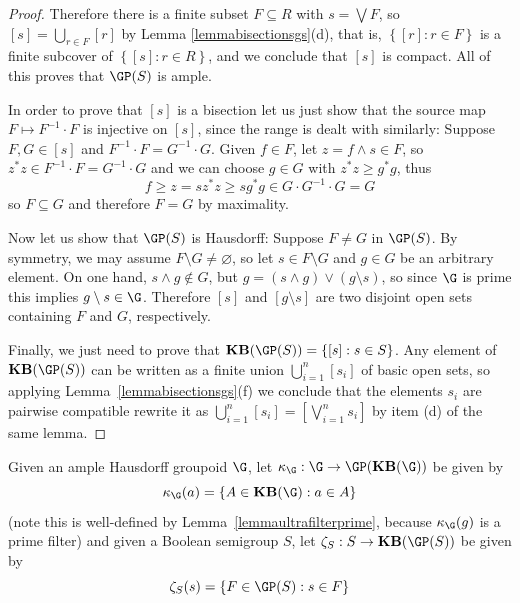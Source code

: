 \begin{proof}
Therefore there is a finite subset $F\subseteq R$ with $s=\bigvee F$, so $[s]=\bigcup_{r\in F}[r]$ by Lemma \ref{lemmabisectionsgs}(d), that is, $\left\{[r]:r\in F\right\}$ is a finite subcover of $\left\{[s]:r\in R\right\}$, and we conclude that $[s]$ is compact. All of this proves that $\GP(S)$ is ample.

In order to prove that $[s]$ is a bisection let us just show that the source map $F\mapsto F^{-1}\cdot F$ is injective on $[s]$, since the range is dealt with similarly: Suppose $F,G\in [s]$ and $F^{-1}\cdot F=G^{-1}\cdot G$. Given $f\in F$, let $z=f\land s\in F$, so $z^*z\in F^{-1}\cdot F=G^{-1}\cdot G$ and we can choose $g\in G$ with $z^*z\geq g^*g$, thus
\[f\geq z=sz^*z\geq sg^*g\in G\cdot G^{-1}\cdot G=G\]
so $F\subseteq G$ and therefore $F=G$ by maximality. 

Now let us show that $\GP(S)$ is Hausdorff: Suppose $F\neq G$ in $\GP(S)$. By symmetry, we may assume $ F\setminus G\neq\varnothing$, so let $s\in F\setminus G$ and $g\in G$ be an arbitrary element. On one hand, $s\land g\not\in G$, but $g=(s\land g)\lor(g\setminus s)$, so since $\G$ is prime this implies $g\setminus s\in\G$. Therefore $[s]$ and $[g\setminus s]$ are two disjoint open sets containing $F$ and $G$, respectively.

Finally, we just need to prove that $\mathbf{KB}(\GP(S))=\left\{[s]:s\in S\right\}$. Any element of $\mathbf{KB}(\GP(S))$ can be written as a finite union $\bigcup_{i=1}^n[s_i]$ of basic open sets, so applying Lemma~\ref{lemmabisectionsgs}(f) we conclude that the elements $s_i$ are pairwise compatible rewrite it as $\bigcup_{i=1}^n[s_i]=[\bigvee_{i=1}^n s_i]$ by item (d) of the same lemma.\qedhere
\end{proof}

Given an ample Hausdorff groupoid $\G$, let $\kappa_{\G}:\G\to\GP(\mathbf{KB}(\G))$ be given by
\[\kappa_{\G}(a)=\left\{A\in\mathbf{KB}(\G):a\in A\right\}\]
(note this is well-defined by Lemma~\ref{lemmaultrafilterprime}, because $\kappa_{\G}(g)$ is a prime filter) and given a Boolean semigroup $S$, let $\zeta_S:S\to\mathbf{KB}(\GP(S))$ be given by
\[\zeta_S(s)=\left\{F\in\GP(S):s\in F\right\}\]

